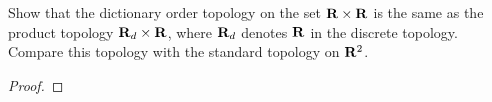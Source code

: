 \begin{problem}[Munkres, \S16, 9.]
Show that the dictionary order topology on the set $\mathbf{R}\times\mathbf{R}$
is the same as the product topology $\mathbf{R}_d\times\mathbf{R}$, where
$\mathbf{R}_d$ denotes $\mathbf{R}$ in the discrete topology. Compare this
topology with the standard topology on $\mathbf{R}^2$.
\end{problem}
\begin{proof}
\end{proof}

